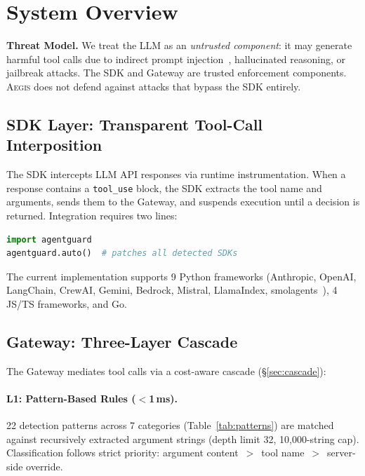 \documentclass[sigconf,nonacm]{acmart}
\newcommand{\system}{\textsc{Aegis}\xspace}
\begin{document}
\section{System Overview}
\label{sec:arch}

\noindent\textbf{Threat Model.}
We treat the LLM as an \emph{untrusted component}: it may generate harmful tool calls due to indirect prompt injection~\cite{greshake2023not}, hallucinated reasoning, or jailbreak attacks. The SDK and Gateway are trusted enforcement components. \system does not defend against attacks that bypass the SDK entirely.

\subsection{SDK Layer: Transparent Tool-Call Interposition}
\label{sdk-layer}

The SDK intercepts LLM API responses via runtime instrumentation. When a response contains a \texttt{tool\_use} block, the SDK extracts the tool name and arguments, sends them to the Gateway, and suspends execution until a decision is returned. Integration requires two lines:

\begin{lstlisting}[language=Python, basicstyle=\scriptsize\ttfamily]
import agentguard
agentguard.auto()  # patches all detected SDKs
\end{lstlisting}

\noindent The current implementation supports 9 Python frameworks (Anthropic, OpenAI, LangChain, CrewAI, Gemini, Bedrock, Mistral, LlamaIndex, smolagents~\cite{smolagents2024}), 4 JS/TS frameworks, and Go.

\subsection{Gateway: Three-Layer Cascade}
\label{gateway}

The Gateway mediates tool calls via a cost-aware cascade (\S\ref{sec:cascade}):

\paragraph{L1: Pattern-Based Rules ($<$1\,ms).}
22 detection patterns across 7 categories (Table~\ref{tab:patterns}) are matched against recursively extracted argument strings (depth limit 32, 10{,}000-string cap). Classification follows strict priority: argument content~$>$~tool name~$>$~server-side override.
\end{document}
